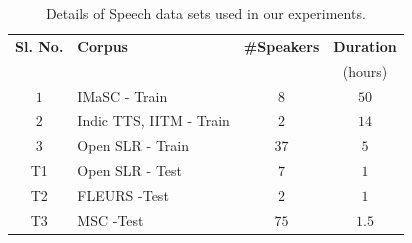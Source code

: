 \documentclass[runningheads]{llncs}
\begin{document}
\begin{table}[htpb]
	\caption{Details of Speech data sets used in our experiments. }
	\label{tab:speechdatasets}
	\centering
	\begin{tabular}{|c|l|c|c|}
		\hline \hline
		\textbf{Sl. No.} & \textbf{Corpus}                                     & \textbf{\#Speakers} & \textbf{Duration} \\
		              &                                                     &                                           & (hours)         \\
		\hline
    		$1$             & IMaSC  \cite{gopinath2022imasc} - Train & $8$                                  & $50$    \\
		$2$             & Indic TTS, IITM \cite{baby2016resources}- Train     & $2$                                    & $14$               \\
		$3$             & Open SLR  \cite{he-etal-2020-open} - Train & $37$                                  & $5$             
           \\\hline
		T1            & Open SLR  \cite{he-etal-2020-open} - Test  & $7$                                   & $1$                \\
   	T2&FLEURS \cite{fleurs2022arxiv}   -Test                                                  &$2$                       & $1$  \\
		 T3&MSC \cite{smcspeech}   -Test                             & $75$                                             & $1.5$                    \\

\hline
	\end{tabular}

\end{table}



\end{document}
